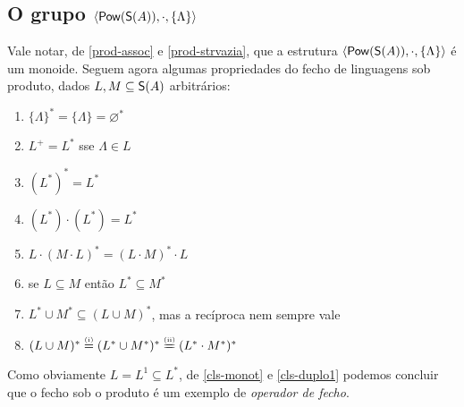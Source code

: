 \subsection{O grupo $\langle \mathsf{Pow}(\mathsf{S}(A)),\cdot,\{ \Lambda \} \rangle$} \label{sec:langsec2}

Vale notar, de \ref{prod-assoc}  e \ref{prod-strvazia}, que a estrutura $\langle \mathsf{Pow}(\mathsf{S}(A)),\cdot,\{ \Lambda \} \rangle$ é um monoide. Seguem agora algumas propriedades do fecho de linguagens sob produto, dados $L,M\subseteq \mathsf{S}(A)$ arbitrários:

\begin{enumerate}[label=(\Alph*)]
	
	\item\label{cls-lambda} 
	$\{\Lambda\}^*=\{\Lambda\}=\varnothing^*$
	
	\item\label{cls-pos}
	$L^+=L^*$ sse $\Lambda\in L$
	
	\item\label{cls-duplo1}
	$(L^*)^*=L^*$
	
	\item\label{cls-duplo2}
	$(L^*)\cdot(L^*)=L^*$
	
	\item\label{cls-interprod1}
	$L\cdot(M\cdot L)^*=(L\cdot M)^*\cdot L$
	
	\item\label{cls-monot}
	se $L\subseteq M$ então $L^*\subseteq M^*$
	
	\item\label{cls-uniao}
	$L^*\cup M^*\subseteq (L\cup M)^*$, mas a recíproca nem sempre vale
	
	\item\label{cls-misc}
	$(L\cup M)^*\defi(L^*\cup M^*)^*\defii(L^*\cdot M^*)^*$
	
\end{enumerate}

\noindent 
Como obviamente $L=L^1\subseteq L^*$, de \ref{cls-monot} e \ref{cls-duplo1} podemos concluir que o fecho sob o produto é um exemplo de \textit{operador de fecho}.